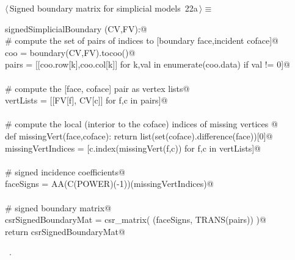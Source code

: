 \documentclass[11pt,oneside]{article}	%
\begin{document}
\begin{flushleft} \small \label{scrap38}
\protect{}$\langle\,$Signed boundary matrix for simplicial models\nobreak\ {\footnotesize 22a}$\,\rangle\equiv$
\vspace{-1ex}
\begin{list}{}{} \item
\mbox{}\verb@def signedSimplicialBoundary (CV,FV):@\\
\mbox{}\verb@   # compute the set of pairs of indices to [boundary face,incident coface]@\\
\mbox{}\verb@   coo = boundary(CV,FV).tocoo()@\\
\mbox{}\verb@   pairs = [[coo.row[k],coo.col[k]] for k,val in enumerate(coo.data) if val != 0]@\\
\mbox{}\verb@@\\
\mbox{}\verb@   # compute the [face, coface] pair as vertex lists@\\
\mbox{}\verb@   vertLists = [[FV[f], CV[c]] for f,c in pairs]@\\
\mbox{}\verb@@\\
\mbox{}\verb@   # compute the local (interior to the coface) indices of missing vertices @\\
\mbox{}\verb@   def missingVert(face,coface): return list(set(coface).difference(face))[0]@\\
\mbox{}\verb@   missingVertIndices = [c.index(missingVert(f,c)) for f,c in vertLists]@\\
\mbox{}\verb@@\\
\mbox{}\verb@   # signed incidence coefficients@\\
\mbox{}\verb@   faceSigns = AA(C(POWER)(-1))(missingVertIndices)@\\
\mbox{}\verb@@\\
\mbox{}\verb@   # signed boundary matrix@\\
\mbox{}\verb@   csrSignedBoundaryMat = csr_matrix( (faceSigns, TRANS(pairs)) )@\\
\mbox{}\verb@   return csrSignedBoundaryMat@\\
\mbox{}\verb@@{\NWsep}
\end{list}
\vspace{-1ex}
\footnotesize\addtolength{\baselineskip}{-1ex}
\begin{list}{}{\setlength{\itemsep}{-\parsep}\setlength{\itemindent}{-\leftmargin}}
\item \NWtxtMacroRefIn\ .
\end{list}
\end{flushleft}
\end{document}

